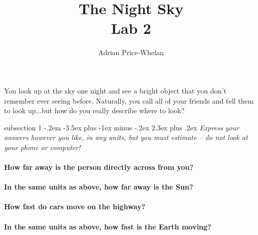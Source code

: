 \documentclass[12pt]{article}
\makeatletter
\newenvironment{problem}{\@startsection
       {subsection}
       {1}
       {-.2em}
       {-3.5ex plus -1ex minus -.2ex}
       {2.3ex plus .2ex}
       {\pagebreak[3]%
       \normalsize\bf\noindent{Problem }
       }
       }
       {%
       }
\renewcommand\section{\@startsection{section}{1}{\z@}%
                                  {-3.5ex \@plus -1ex \@minus -.2ex}%
                                  {2.3ex \@plus.2ex}%
                                  {\normalfont\large\bfseries}}
\makeatother
\begin{document}
\title{The Night Sky\\ \large \textbf{Lab 2}}
\author{Adrian Price-Whelan}
\date{}%

\maketitle

\thispagestyle{empty}

\indent\indent You look up at the sky one night and see a bright object that you don't remember ever seeing before. Naturally, you call all of your friends and tell them to look up...but how do you really describe where to look? 


\begin{problem}{ }
	\textit{Express your answers however you like, in any units, but you must estimate -- do not look at your phone or computer!}  \\ \\
	\textbf{How far away is the person directly across from you?} \hrulefill \\ \\
	\textbf{In the same units as above, how far away is the Sun?} \hrulefill \\ \\
	\textbf{How fast do cars move on the highway?} \hrulefill \\ \\
	\textbf{In the same units as above, how fast is the Earth moving?} \hrulefill 
\end{problem}

\end{document}
